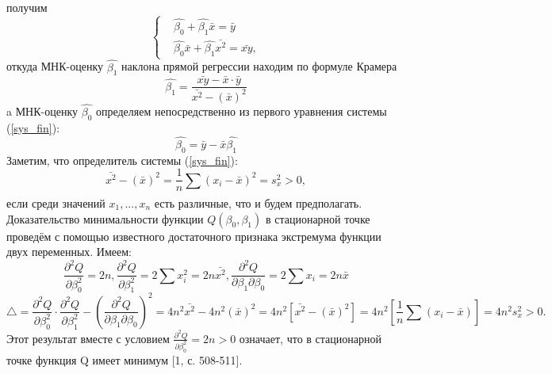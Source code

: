 \documentclass{article}
\begin{document}
	получим
		\begin{equation}
	   \begin{cases}
         & \hat{\beta_{0}} + \hat{\beta_{1}}\bar{x} = 
         \bar{y}\\ 
        & \hat{\beta_{0}}\bar{x} + \hat{\beta_{1}}\bar{x^{2}} = \bar{xy},
       \end{cases}
       \label{sys_fin}
	\end{equation}
	откуда МНК-оценку $\hat{\beta_1}$ наклона прямой регрессии находим по формуле Крамера
	\begin{equation}
	    \hat{\beta_{1}} = \frac{\bar{xy} - \bar{x} \cdot \bar{y}}{\bar{x^{2}} - (\bar{x})^{2}}
	    \label{beta_1_new}
	\end{equation}
	a МНК-оценку $\hat{\beta_0}$  определяем непосредственно из первого уравнения системы (\ref{sys_fin}):
	\begin{equation}
	    \hat{\beta_{0}} = \bar{y} - \bar{x}\hat{\beta_{1}}
	    \label{beta_0_new}
	\end{equation}
	Заметим, что определитель системы (\ref{sys_fin}):
	\begin{equation}
	    \bar{x^{2}} - (\bar{x})^{2} = \frac{1}{n}\sum_{}{}{(x_{i} - \bar{x})^{2}} = s_{x}^{2} > 0, 
	\end{equation}
	если среди значений $x_{1},...,x_{n}$ есть различные, что и будем предполагать.
	\newline
	Доказательство минимальности функции $Q(\beta_{0}, \beta_{1})$ в стационарной точке проведём с помощью известного достаточного признака экстремума функции двух переменных. Имеем:
	\begin{equation}
	    \frac{\partial ^{2} Q}{\partial \beta_{0}^{2}} = 2n, 
        \frac{\partial ^{2} Q}{\partial \beta_{1}^{2}} = 2\sum_{}{}{x_{i}^{2}} = 2n\bar{x^{2}}, 
        \frac{\partial ^{2} Q}{\partial \beta_{1} \partial \beta_{0}} = 2\sum_{}{}{x_{i}} = 2n\bar{x}
        \label{frac_eq}
	\end{equation}
	\begin{equation}
	    \bigtriangleup = \frac{\partial^{2}Q}{\partial \beta_{0}^{2}} \cdot \frac{\partial^{2}Q}{\partial \beta_{1}^{2}} - (\frac{\partial^{2}Q}{\partial \beta_{1} \partial \beta_{0}})^{2} = 
	    4n^{2}\bar{x^{2}} - 4n^2(\bar{x})^{2} = 
	    4n^{2}\left[\bar{x^{2}} - (\bar{x})^{2}\right] = 4n^{2}\left[ \frac{1}{n}\sum{}_{}{(x_{i} - \bar{x})}\right] = 4n^{2}s_{x}^{2} > 0.
	    \label{det_sys}
	\end{equation}
	Этот результат вместе с условием $\frac{\partial^{2}Q}{\partial \beta_{0}^{2}} = 2n > 0$ означает, что в стационарной точке функция Q имеет минимум [1, с. 508-511].
\end{document}
